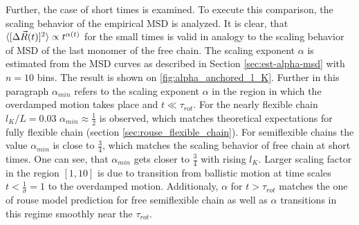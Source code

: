 \documentclass[
    paper=A4,pagesize=automedia,fontsize=12pt,
    BCOR=15mm,DIV=22,
    twoside,headinclude,footinclude=false,
    fleqn,             %
    bibliography=totocnumbered,          %
    listof=totoc,                %
    listof=flat,                 %
    cleardoublepage=empty      %
    numbers=endperiod
]{scrartcl}
\begin{document}
\vspace{0.5cm}
Further, the case of short times is examined. To execute this comparison,
the scaling behavior of the empirical MSD is analyzed. It is clear, that
$\langle[\Delta \vec{R}(t)]^2\rangle \propto t^{\alpha(t)}$ for the small times is valid
in analogy to the scaling behavior of MSD of the last monomer of the free chain. 
The scaling exponent $\alpha$ is estimated from the MSD curves as 
described in Section \ref{sec:est-alpha-msd} with $n=10$ bins. 
The result is shown on \autoref{fig:alpha_anchored_l_K}.
Further in this paragraph $\alpha_{min}$ refers to the scaling exponent $\alpha$
in the region in which the overdamped motion takes place and $t \ll \tau_{rot}$. 
For the nearly flexible chain $l_K/L = 0.03$ $\alpha_{min} \approx \frac{1}{2}$
is observed, which matches theoretical expectations for fully flexible chain 
(section \ref{sec:rouse_flexible_chain}).
For semiflexible chains the value $\alpha_{min}$ is close to $\frac{3}{4}$, which
matches the scaling behavior of free chain at short times. 
One can see, that $\alpha_{min}$ gets closer to $\frac{3}{4}$ with rising $l_K$. Larger
scaling factor in the region $[1, 10]$ is due to transition from 
ballistic motion at time scales $t<\frac{1}{\sigma} = 1$ to the overdamped motion.
Additionaly, $\alpha$ for $t>\tau_{rot}$ matches the one of rouse model prediction
for free semiflexible chain as well as $\alpha$ transitions in this regime smoothly
near the $\tau_{rot}$.
\end{document}
